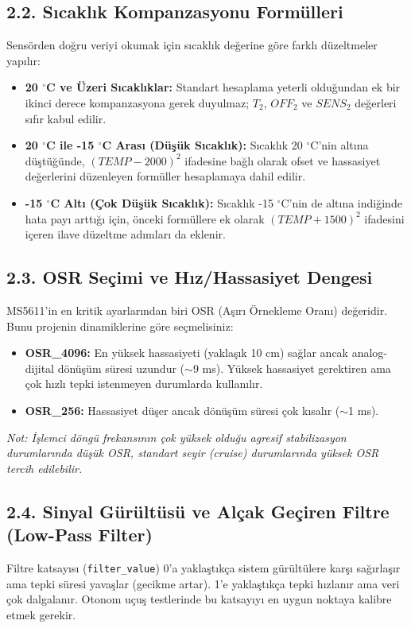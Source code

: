 \documentclass[12pt, a4paper]{article}
\begin{document}
\subsection*{2.2. Sıcaklık Kompanzasyonu Formülleri}
Sensörden doğru veriyi okumak için sıcaklık değerine göre farklı düzeltmeler yapılır:
\begin{itemize}
\item \textbf{20 $^\circ$C ve Üzeri Sıcaklıklar:} Standart hesaplama yeterli olduğundan ek bir ikinci derece kompanzasyona gerek duyulmaz; $T_2$, $OFF_2$ ve $SENS_2$ değerleri sıfır kabul edilir.
\item \textbf{20 $^\circ$C ile -15 $^\circ$C Arası (Düşük Sıcaklık):} Sıcaklık 20 $^\circ$C'nin altına düştüğünde, $(TEMP - 2000)^2$ ifadesine bağlı olarak ofset ve hassasiyet değerlerini düzenleyen formüller hesaplamaya dahil edilir.
\item \textbf{-15 $^\circ$C Altı (Çok Düşük Sıcaklık):} Sıcaklık -15 $^\circ$C'nin de altına indiğinde hata payı arttığı için, önceki formüllere ek olarak $(TEMP + 1500)^2$ ifadesini içeren ilave düzeltme adımları da eklenir.
\end{itemize}

\subsection*{2.3. OSR Seçimi ve Hız/Hassasiyet Dengesi}
MS5611'in en kritik ayarlarından biri OSR (Aşırı Örnekleme Oranı) değeridir. Bunu projenin dinamiklerine göre seçmelisiniz:
\begin{itemize}
\item \textbf{OSR\_4096:} En yüksek hassasiyeti (yaklaşık 10 cm) sağlar ancak analog-dijital dönüşüm süresi uzundur ($\sim$9 ms). Yüksek hassasiyet gerektiren ama çok hızlı tepki istenmeyen durumlarda kullanılır.
\item \textbf{OSR\_256:} Hassasiyet düşer ancak dönüşüm süresi çok kısalır ($\sim$1 ms).
\end{itemize}
\textit{Not: İşlemci döngü frekansının çok yüksek olduğu agresif stabilizasyon durumlarında düşük OSR, standart seyir (cruise) durumlarında yüksek OSR tercih edilebilir.}

\subsection*{2.4. Sinyal Gürültüsü ve Alçak Geçiren Filtre (Low-Pass Filter)}
Filtre katsayısı (\texttt{filter\_value}) 0'a yaklaştıkça sistem gürültülere karşı sağırlaşır ama tepki süresi yavaşlar (gecikme artar). 1'e yaklaştıkça tepki hızlanır ama veri çok dalgalanır. Otonom uçuş testlerinde bu katsayıyı en uygun noktaya kalibre etmek gerekir.
\end{document}
